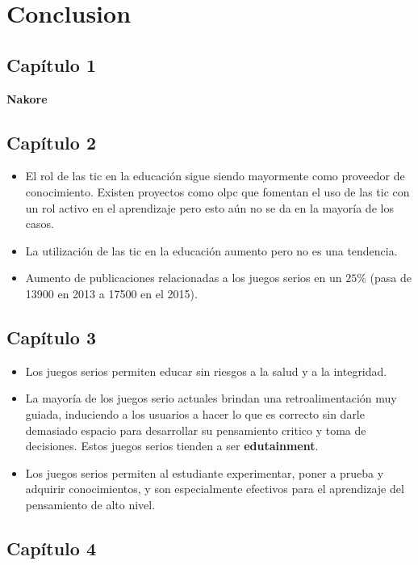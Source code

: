 \chapter{Conclusion}

\section{Capítulo 1}

\textbf{Nakore}

\section{Capítulo 2}

\begin{itemize}
\item El rol de las \gls{tic} en la educación sigue siendo mayormente como
    proveedor de conocimiento. Existen proyectos como \gls{olpc} que fomentan el
    uso de las \gls{tic} con un rol activo en el aprendizaje pero esto aún no se
    da en la mayoría de los casos.
\item La utilización de las \gls{tic} en la educación aumento pero no es una
    tendencia.
\item Aumento de publicaciones relacionadas a los juegos serios en un $25\%$
    (pasa de 13900 en 2013 a 17500 en el 2015). 
\end{itemize}

\section{Capítulo 3}

\begin{itemize}
\item Los juegos serios permiten educar sin riesgos a la salud y a la
    integridad.
\item La mayoría de los juegos serio actuales brindan una retroalimentación muy
    guiada, induciendo a los usuarios a hacer lo que es correcto sin darle
    demasiado espacio para desarrollar su pensamiento critico y toma de
    decisiones. Estos juegos serios tienden a ser \textbf{edutainment}.
\item Los juegos serios permiten al estudiante experimentar, poner a prueba y
    adquirir conocimientos, y son especialmente efectivos para el aprendizaje
    del pensamiento de alto nivel.
\end{itemize}

\section{Capítulo 4}

